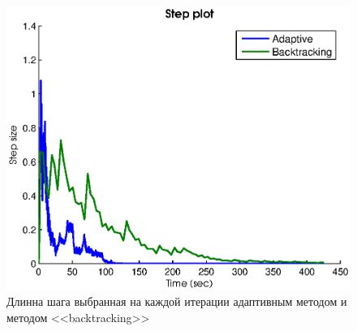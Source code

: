\documentclass{article}
\begin{document}
\begin{figure}
    \centering
    \includegraphics[width=\textwidth]{step_adap_vs_adapBack.eps}
    \caption{Длинна шага выбранная на каждой итерации адаптивным методом и методом <<backtracking>>}
\end{figure}
\end{document}
